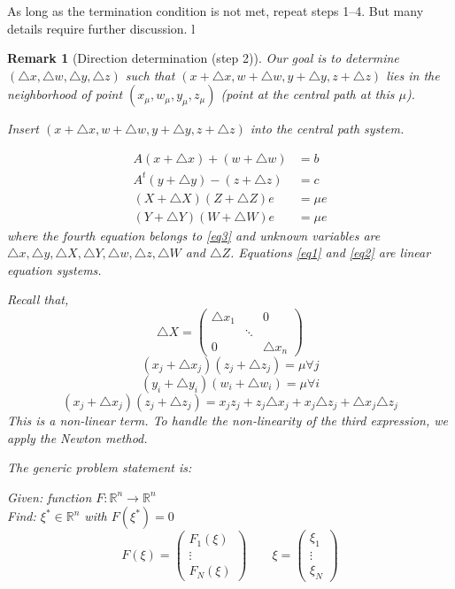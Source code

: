 \documentclass[a4paper]{article}
\numberwithin{lecref}{section}
\newtheorem*{Remark}{Remark}
\begin{document}
As long as the termination condition is not met, repeat steps 1--4.
But many details require further discussion.
l
\begin{Remark}[Direction determination (step 2)]
	Our goal is to determine $(\triangle x, \triangle w, \triangle y, \triangle z)$ such that $(x + \triangle x, w + \triangle w, y + \triangle y, z + \triangle z)$ lies in the neighborhood of point $(x_\mu, w_\mu, y_\mu, z_\mu)$ (point at the central path at this $\mu$).

	Insert $(x + \triangle x, w + \triangle w, y + \triangle y, z + \triangle z)$ into the central path system.

	\begin{align}
		A(x + \triangle x) + (w + \triangle w) &= b \label{eq1}\\
		A^t(y + \triangle y) - (z + \triangle z) &= c \label{eq2}\\
		(X + \triangle X)(Z + \triangle Z) e &= \mu e \label{eq3}\\
		(Y + \triangle Y)(W + \triangle W) e &= \mu e \nonumber
	\end{align}
	where the fourth equation belongs to \ref{eq3} and unknown variables are $\triangle x, \triangle y, \triangle X, \triangle Y, \triangle w, \triangle z, \triangle W$ and $\triangle Z$.
	Equations \ref{eq1} and \ref{eq2} are linear equation systems.

	Recall that,
	\[
		\triangle X = \begin{pmatrix}
			\triangle x_1 & & 0 \\
			& \ddots & \\
			0 & & \triangle x_n
		\end{pmatrix}
	\]
	\[ (x_j + \triangle x_j) (z_j + \triangle z_j) = \mu \forall j \]
	\[ (y_i + \triangle y_i) (w_i + \triangle w_i) = \mu \forall i \]
	\[ (x_j + \triangle x_j) (z_j + \triangle z_j) = x_j z_j + z_j \triangle x_j + x_j \triangle z_j + \triangle x_j \triangle z_j \]
	This is a non-linear term. To handle the non-linearity of the third expression, we apply the Newton method.

	The generic problem statement is:

	\emph{Given:} function $F: \mathbb R^n \to \mathbb R^n$ \\
	\emph{Find:} $\xi^* \in \mathbb R^n$ with $F(\xi^*) = 0$
	\[ F(\xi) = \begin{pmatrix} F_1(\xi) \\ \vdots \\ F_N(\xi) \end{pmatrix} \qquad \xi = \begin{pmatrix} \xi_1 \\ \vdots \\ \xi_N \end{pmatrix} \]


\end{Remark}
\end{document}

